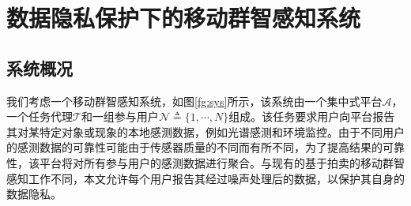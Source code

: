 \section{数据隐私保护下的移动群智感知系统}\label{sec:problem}
\subsection{系统概况}
	我们考虑一个移动群智感知系统，如图\ref{fg:sys}所示，该系统由一个集中式平台$\mathcal{A}$，一个任务代理$\mathcal{T}$和一组参与用户$\mathcal{N}\triangleq\{1,\cdots,N\}$组成。该任务要求用户向平台报告其对某特定对象或现象的本地感测数据，例如光谱感测和环境监控。由于不同用户的感测数据的可靠性可能由于传感器质量的不同而有所不同\cite{jin2016inception}，为了提高结果的可靠性，该平台将对所有参与用户的感测数据进行聚合。{\kaishu 与现有的基于拍卖的移动群智感知工作不同\cite{yang2012crowdsourcing,feng2014trac,Zhao,wen2015quality,zhang2015incentivize,zhang2015truthful,jin2015quality,jin2016inception,zhang2016privacy,duan2012incentive,Shibo14,peng2015pay,cheung2015distributed,he2017exchange,gong2017truthful}，本文允许每个用户报告其经过噪声处理后的数据，以保护其自身的数据隐私\cite{wang2016value}。}
	
